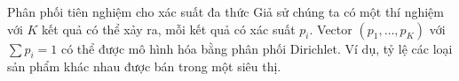 		Phân phối tiên nghiệm cho xác suất đa thức
		Giả sử chúng ta có một thí nghiệm với $K$ kết quả có thể xảy ra, mỗi kết quả có xác suất $p_i$. Vector $(p_1, \dots, p_K)$ với $\sum p_i = 1$ có thể được mô hình hóa bằng phân phối Dirichlet. Ví dụ, tỷ lệ các loại sản phẩm khác nhau được bán trong một siêu thị.

